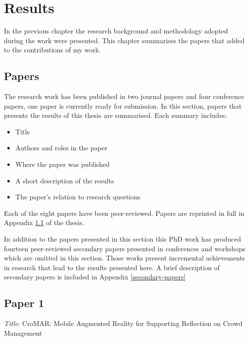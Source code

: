 \chapter{Results}\label{results}


In the previous chapter the research background and methodology adopted during the work were presented. This chapter summarises the papers that added to the contributions of my work.

\section{Papers}\label{papers}

The research work has been published in two journal papers and four conference papers, one paper is currently ready for submission. In this section, papers that presents the results of this thesis are summarised. Each summary includes:
\begin{itemize}
	\itemsep1pt\parskip0pt 
	\item Title 
	\item Authors and roles in the paper 
	\item Where the paper was published 
	\item A short description of the results 
	\item The paper's relation to research questions 
\end{itemize}

Each of the eight papers have been peer-reviewed. Papers are reprinted in full in Appendix \ref{papers} of the thesis.

In addition to the papers presented in this section this PhD work has produced fourteen peer-reviewed secondary papers presented in conferences and workshops which are omitted in this section. Those works present incremental achievements in research that lead to the results presented here. A brief description of secondary papers is included in Appendix \ref{secondary-papers}

\section[CroMAR: Mobile Augmented Reality for Supporting Reflection on Crowd Management]{Paper 1} \label{paper-1}

\emph{Title}: CroMAR: Mobile Augmented Reality for Supporting Reflection on Crowd Management

